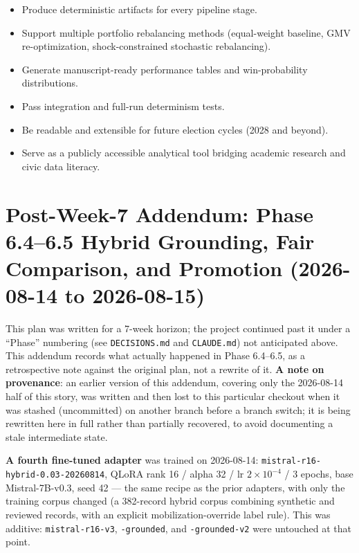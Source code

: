 \documentclass[11pt]{article}
\begin{document}
\begin{itemize}[leftmargin=1.6em, itemsep=3pt]
  \item Produce deterministic artifacts for every pipeline stage.
  \item Support multiple portfolio rebalancing methods (equal-weight baseline,
        GMV re-optimization, shock-constrained stochastic rebalancing).
  \item Generate manuscript-ready performance tables and win-probability distributions.
  \item Pass integration and full-run determinism tests.
  \item Be readable and extensible for future election cycles (2028 and beyond).
  \item Serve as a publicly accessible analytical tool bridging academic research and
        civic data literacy.
\end{itemize}

\section*{Post-Week-7 Addendum: Phase 6.4--6.5 Hybrid Grounding, Fair Comparison, and Promotion (2026-08-14 to 2026-08-15)}

This plan was written for a 7-week horizon; the project continued past it under a
``Phase'' numbering (see \texttt{DECISIONS.md} and \texttt{CLAUDE.md}) not anticipated
above. This addendum records what actually happened in Phase 6.4--6.5, as a
retrospective note against the original plan, not a rewrite of it. \textbf{A note on
provenance}: an earlier version of this addendum, covering only the 2026-08-14 half of
this story, was written and then lost to this particular checkout when it was stashed
(uncommitted) on another branch before a branch switch; it is being rewritten here in
full rather than partially recovered, to avoid documenting a stale intermediate state.

\textbf{A fourth fine-tuned adapter} was trained on 2026-08-14:
\texttt{mistral-r16-hybrid-0.03-20260814}, QLoRA rank 16 / alpha 32 / lr $2\times10^{-4}$
/ 3 epochs, base Mistral-7B-v0.3, seed 42 --- the same recipe as the prior adapters,
with only the training corpus changed (a 382-record hybrid corpus combining synthetic
and reviewed records, with an explicit mobilization-override label rule). This was
additive: \texttt{mistral-r16-v3}, \texttt{-grounded}, and \texttt{-grounded-v2} were
untouched at that point.
\end{document}
